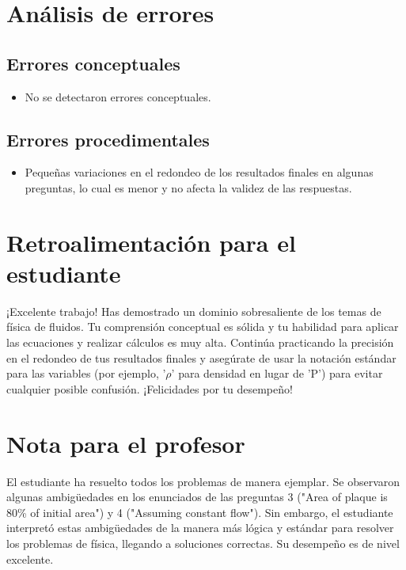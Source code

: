 \documentclass[11pt,a4paper]{article}
\begin{document}
\section*{Análisis de errores}

\subsection*{Errores conceptuales}
\begin{itemize}[leftmargin=1.5em, itemsep=2pt]
  \item No se detectaron errores conceptuales.
\end{itemize}

\subsection*{Errores procedimentales}
\begin{itemize}[leftmargin=1.5em, itemsep=2pt]
  \item Pequeñas variaciones en el redondeo de los resultados finales en algunas preguntas, lo cual es menor y no afecta la validez de las respuestas.
\end{itemize}

\section*{Retroalimentación para el estudiante}
\begin{tcolorbox}[cajaRecomendacion, title={Dirigido a: daniela escribano 32031568}]
¡Excelente trabajo! Has demostrado un dominio sobresaliente de los temas de física de fluidos. Tu comprensión conceptual es sólida y tu habilidad para aplicar las ecuaciones y realizar cálculos es muy alta. Continúa practicando la precisión en el redondeo de tus resultados finales y asegúrate de usar la notación estándar para las variables (por ejemplo, '$\rho$' para densidad en lugar de 'P') para evitar cualquier posible confusión. ¡Felicidades por tu desempeño!
\end{tcolorbox}

\section*{Nota para el profesor}
\begin{tcolorbox}[
  enhanced, breakable,
  colback=yellow!8, colframe=yellow!60!black,
  fonttitle=\bfseries, coltitle=black,
  title={Observaciones para revisión manual},
  top=4pt, bottom=4pt, left=8pt, right=8pt,
]
El estudiante ha resuelto todos los problemas de manera ejemplar. Se observaron algunas ambigüedades en los enunciados de las preguntas 3 ("Area of plaque is 80\% of initial area") y 4 ("Assuming constant flow"). Sin embargo, el estudiante interpretó estas ambigüedades de la manera más lógica y estándar para resolver los problemas de física, llegando a soluciones correctas. Su desempeño es de nivel excelente.
\end{tcolorbox}
\end{document}
